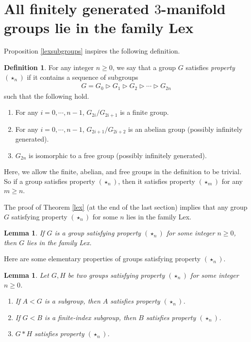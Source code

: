 \documentclass{amsart}
\numberwithin{equation}{section}
\newtheorem{lemma}[theorem]{Lemma}
\theoremstyle{definition}
\newtheorem{definition}[theorem]{Definition}
\begin{document}
\section{All finitely generated $3$-manifold groups lie in the family Lex}\label{morelexsection}
Proposition \ref{lexsubgroups} inspires the following definition.
\begin{definition}\label{starn}
For any integer $n\geq 0$, we say that a group $G$ satisfies {\it property $(\star_n)$} if it contains a sequence of subgroups 
\begin{align}\label{8.1}
G=G_0\vartriangleright  G_1\vartriangleright  G_2\vartriangleright  \cdots \vartriangleright  G_{2n}
\end{align}
such that the following hold.
\begin{enumerate}
\item For any $i=0,\cdots,n-1$, $G_{2i}/G_{2i+1}$ is a finite group.
\item For any $i=0,\cdots,n-1$, $G_{2i+1}/G_{2i+2}$ is an abelian group (possibly infinitely generated).
\item $G_{2n}$ is isomorphic to a free group (possibly infinitely generated).
\end{enumerate}
\end{definition}
Here, we allow the finite, abelian, and free groups in the definition to be trivial. So if a group satisfies property $(\star_n)$, then it satisfies property $(\star_m)$ for any $m\geq n$.

The proof of Theorem \ref{lex} (at the end of the last section) implies that any group $G$ satisfying property $(\star_n)$ for some $n$ lies in the family Lex.

\begin{lemma}\label{elementarylex}
If $G$ is a group satisfying property $(\star_n)$ for some integer $n\geq 0$, then $G$ lies in the family Lex.
\end{lemma}

Here are some elementary properties of groups satisfying property $(\star_n)$.
\begin{lemma}\label{starnproperty}
Let $G,H$ be two groups satisfying property $(\star_n)$ for some integer $n\geq 0$.
\begin{enumerate}
\item If $A<G$ is a subgroup, then $A$ satisfies property $(\star_n)$.
\item If $G<B$ is a finite-index subgroup, then $B$ satisfies property $(\star_n)$.
\item $G*H$ satisfies property $(\star_n)$.
\end{enumerate}
\end{lemma}
\end{document}
